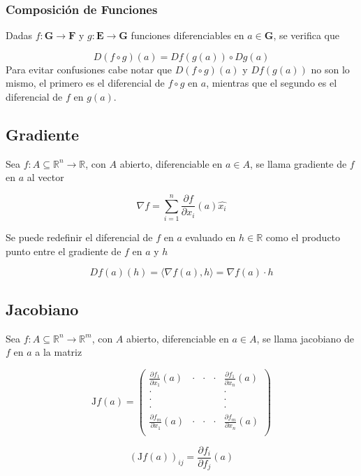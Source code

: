 \subsubsection{Composición de Funciones}

Dadas $f:\mathbf{G}\to\mathbf{F}$ y $g:\mathbf{E}\to\mathbf{G}$ funciones diferenciables en $a\in\mathbf{G}$, se verifica que

\[D(f\circ g)(a) = Df(g(a))\circ Dg(a)\]
\bigbreak
Para evitar confusiones cabe notar que $D(f\circ g)(a)$ y $Df(g(a))$ no son lo mismo, el primero es el diferencial de $f\circ g$ en $a$, mientras que el segundo es el diferencial de $f$ en $g(a)$.

\subsection{Gradiente}

Sea $f:A\subseteq\mathbb{R}^n\to\mathbb{R}$, con $A$ abierto, diferenciable en $a\in A$, se llama gradiente de $f$ en $a$ al vector

\[\nabla f = \sum^n_{i=1}\frac{\partial f}{\partial x_i}(a)\hat{x_i}\]

\bigbreak
Se puede redefinir el diferencial de $f$ en $a$ evaluado en $h\in\mathbb{R}$ como el producto punto entre el gradiente de $f$ en $a$ y $h$

\[Df(a)(h) = \langle\nabla f(a), h\rangle = \nabla f(a)\cdot h\]

\subsection{Jacobiano}

Sea $f:A\subseteq\mathbb{R}^n\to\mathbb{R}^m$, con $A$ abierto, diferenciable en $a\in A$, se llama jacobiano de $f$ en $a$ a la matriz

\begin{minipage}{0.55\textwidth}
\begin{equation}
\mathrm{J}f(a) = \begin{pmatrix}
\frac{\partial f_1}{\partial x_1}(a) &\cdot &\cdot &\cdot
& \frac{\partial f_1}{\partial x_n}(a)\\
\cdot & & & & \cdot\\
\cdot & & & & \cdot\\
\cdot & & & & \cdot\\
\frac{\partial f_m}{\partial x_1}(a) &\cdot &\cdot &\cdot
& \frac{\partial f_m}{\partial x_n}(a)\\
\end{pmatrix}
\nonumber
\end{equation}
\end{minipage}
\begin{minipage}{0.55\textwidth}
\begin{equation}
\left(\mathrm{J}f(a)\right)_{ij} = 
\frac{\partial f_i}{\partial f_j}(a)
\nonumber
\end{equation}
\end{minipage}


